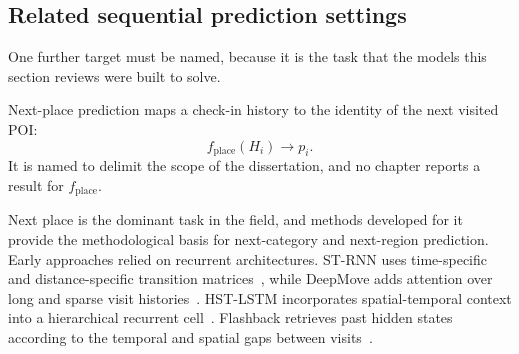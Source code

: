 \subsection{Related sequential prediction settings}

One further target must be named, because it is the task that the models this section
reviews were built to solve.

\begin{definition}\label{def:fund:nextplace}
    Next-place prediction maps a check-in history to the identity of the next visited POI:
    \begin{equation}
        f_{\mathrm{place}}(H_i)\longrightarrow p_i.
    \end{equation}
    It is named to delimit the scope of the dissertation, and no chapter reports a result
    for $f_{\mathrm{place}}$.
\end{definition}

Next place is the dominant task in the field, and methods developed for it provide the
methodological basis for next-category and next-region prediction. Early approaches
relied on recurrent architectures. ST-RNN uses time-specific and distance-specific
transition matrices~\cite{liu2016strnn}, while DeepMove adds attention over long and
sparse visit histories~\cite{feng2018deepmove}. HST-LSTM incorporates
spatial-temporal context into a hierarchical recurrent cell~\cite{kong2018hstlstm}.
Flashback retrieves past hidden states according to the temporal and spatial gaps
between visits~\cite{yang2020flashback}.

